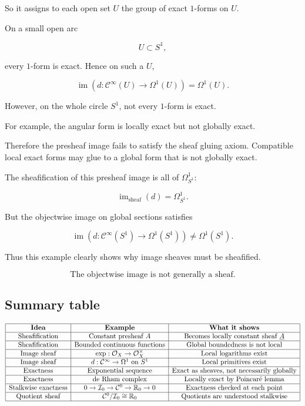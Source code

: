 \documentclass[12pt,a4paper]{article}
\DeclareMathOperator{\im}{im}
\theoremstyle{notespace}
\newcommand{\C}{\mathcal C}
\newcommand{\Ocal}{\mathcal O}
\newcommand{\I}{\mathcal I}
\begin{document}
	So it assigns to each open set $U$ the group of exact $1$-forms on $U$.
	
	On a small open arc
	
	\[
	U\subset S^1,
	\]
	
	every $1$-form is exact. Hence on such a $U$,
	
	\[
	\im
	\left(
	d:\C^\infty(U)\to \Omega^1(U)
	\right)
	=
	\Omega^1(U).
	\]
	
	However, on the whole circle $S^1$, not every $1$-form is exact.
	
	For example, the angular form is locally exact but not globally exact.
	
	Therefore the presheaf image fails to satisfy the sheaf gluing axiom.
	Compatible local exact forms may glue to a global form that is not globally
	exact.
	
	The sheafification of this presheaf image is all of $\Omega^1_{S^1}$:
	
	\[
	\im_{\text{sheaf}}(d)=\Omega^1_{S^1}.
	\]
	
	But the objectwise image on global sections satisfies
	
	\[
	\im
	\left(
	d:\C^\infty(S^1)\to \Omega^1(S^1)
	\right)
	\neq
	\Omega^1(S^1).
	\]
	
	Thus this example clearly shows why image sheaves must be sheafified.
	
	\[
	\boxed{
		\text{The objectwise image is not generally a sheaf.}
	}
	\]
	
	\subsection{Summary table}
	
	\[
	\begin{array}{|c|c|c|}
		\hline
		\textbf{Idea} & \textbf{Example} & \textbf{What it shows} \\
		\hline
		\text{Sheafification}
		&
		\text{Constant presheaf } A
		&
		\text{Becomes locally constant sheaf } \underline A
		\\
		\hline
		\text{Sheafification}
		&
		\text{Bounded continuous functions}
		&
		\text{Global boundedness is not local}
		\\
		\hline
		\text{Image sheaf}
		&
		\exp:\Ocal_X\to\Ocal_X^\times
		&
		\text{Local logarithms exist}
		\\
		\hline
		\text{Image sheaf}
		&
		d:\C^\infty\to\Omega^1 \text{ on } S^1
		&
		\text{Local primitives exist}
		\\
		\hline
		\text{Exactness}
		&
		\text{Exponential sequence}
		&
		\text{Exact as sheaves, not necessarily globally}
		\\
		\hline
		\text{Exactness}
		&
		\text{de Rham complex}
		&
		\text{Locally exact by Poincaré lemma}
		\\
		\hline
		\text{Stalkwise exactness}
		&
		0\to\I_0\to\C^0\to\mathbb R_0\to0
		&
		\text{Exactness checked at each point}
		\\
		\hline
		\text{Quotient sheaf}
		&
		\C^0/\I_0\cong\mathbb R_0
		&
		\text{Quotients are understood stalkwise}
		\\
		\hline
	\end{array}
	\]
	
\end{document}

